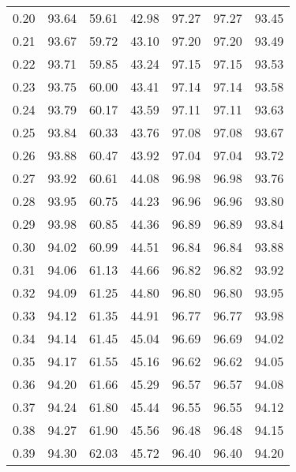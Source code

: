 \begin{tabular}{|c|c|c|c|c|c|c|}
      0.20 &     93.64 &     59.61 &      42.98 &   97.27 &      97.27 &         93.45 \\
      0.21 &     93.67 &     59.72 &      43.10 &   97.20 &      97.20 &         93.49 \\
      0.22 &     93.71 &     59.85 &      43.24 &   97.15 &      97.15 &         93.53 \\
      0.23 &     93.75 &     60.00 &      43.41 &   97.14 &      97.14 &         93.58 \\
      0.24 &     93.79 &     60.17 &      43.59 &   97.11 &      97.11 &         93.63 \\
      0.25 &     93.84 &     60.33 &      43.76 &   97.08 &      97.08 &         93.67 \\
      0.26 &     93.88 &     60.47 &      43.92 &   97.04 &      97.04 &         93.72 \\
      0.27 &     93.92 &     60.61 &      44.08 &   96.98 &      96.98 &         93.76 \\
      0.28 &     93.95 &     60.75 &      44.23 &   96.96 &      96.96 &         93.80 \\
      0.29 &     93.98 &     60.85 &      44.36 &   96.89 &      96.89 &         93.84 \\
      0.30 &     94.02 &     60.99 &      44.51 &   96.84 &      96.84 &         93.88 \\
      0.31 &     94.06 &     61.13 &      44.66 &   96.82 &      96.82 &         93.92 \\
      0.32 &     94.09 &     61.25 &      44.80 &   96.80 &      96.80 &         93.95 \\
      0.33 &     94.12 &     61.35 &      44.91 &   96.77 &      96.77 &         93.98 \\
      0.34 &     94.14 &     61.45 &      45.04 &   96.69 &      96.69 &         94.02 \\
      0.35 &     94.17 &     61.55 &      45.16 &   96.62 &      96.62 &         94.05 \\
      0.36 &     94.20 &     61.66 &      45.29 &   96.57 &      96.57 &         94.08 \\
      0.37 &     94.24 &     61.80 &      45.44 &   96.55 &      96.55 &         94.12 \\
      0.38 &     94.27 &     61.90 &      45.56 &   96.48 &      96.48 &         94.15 \\
      0.39 &     94.30 &     62.03 &      45.72 &   96.40 &      96.40 &         94.20 \\

\end{tabular}
